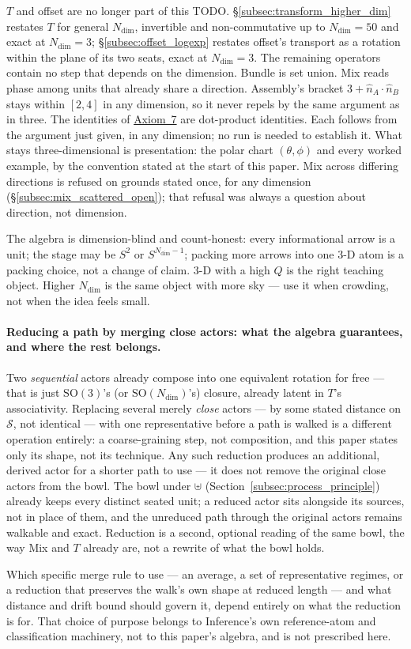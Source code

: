 \documentclass[12pt, a4paper]{article}
\begin{document}
$T$ and offset are no longer part of this TODO.
\S\ref{subsec:transform_higher_dim} restates $T$ for general
$N_{\mathrm{dim}}$, invertible and non-commutative up to
$N_{\mathrm{dim}}=50$ and exact at $N_{\mathrm{dim}}=3$;
\S\ref{subsec:offset_logexp} restates offset's transport as a
rotation within the plane of its two seats, exact at
$N_{\mathrm{dim}}=3$. The remaining operators contain no step that
depends on the dimension. Bundle is set union. Mix reads phase among
units that already share a direction. Assembly's bracket
$3+\hat n_A\cdot\hat n_B$ stays within $[2,4]$ in any dimension, so it
never repels by the same argument as in three. The identities of
\hyperref[subsec:axiom_v1_metrics]{Axiom~7} are dot-product
identities. Each follows from the argument just given, in any
dimension; no run is needed to establish it. What stays three-dimensional is presentation: the
polar chart $(\theta,\phi)$ and every worked example, by the
convention stated at the start of this paper. Mix across differing
directions is refused on grounds stated once, for any dimension
(\S\ref{subsec:mix_scattered_open}); that refusal was always a
question about direction, not dimension.

The algebra is dimension-blind and count-honest: every informational
arrow is a unit; the stage may be $S^2$ or $S^{N_{\mathrm{dim}}-1}$;
packing more arrows into one 3-D atom is a packing choice, not a
change of claim. 3-D with a high $Q$ is the right teaching object.
Higher $N_{\mathrm{dim}}$ is the same object with more sky --- use it
when crowding, not when the idea feels small.


\paragraph{Reducing a path by merging close actors: what the algebra
guarantees, and where the rest belongs.} Two \emph{sequential} actors
already compose into one equivalent rotation for free --- that is
just $\mathrm{SO}(3)$'s (or $\mathrm{SO}(N_{\mathrm{dim}})$'s) closure,
already latent in $T$'s associativity. Replacing several merely
\emph{close} actors --- by some stated distance on $\mathcal{S}$, not
identical --- with one representative before a path is walked is a
different operation entirely: a coarse-graining step, not
composition, and this paper states only its shape, not its
technique. Any such reduction produces an additional, derived actor
for a shorter path to use --- it does not remove the original close
actors from the bowl. The bowl under $\uplus$
(Section~\ref{subsec:process_principle}) already keeps every
distinct seated unit; a reduced actor sits alongside its sources, not
in place of them, and the unreduced path through the original actors
remains walkable and exact. Reduction is a second, optional reading
of the same bowl, the way Mix and $T$ already are, not a rewrite of
what the bowl holds.

Which specific merge rule to use --- an average, a set of
representative regimes, or a reduction that preserves the walk's own
shape at reduced length --- and what distance and drift bound should
govern it, depend entirely on what the reduction is for. That choice
of purpose belongs to Inference's own reference-atom and
classification machinery, not to this paper's algebra, and is not
prescribed here.
\end{document}
